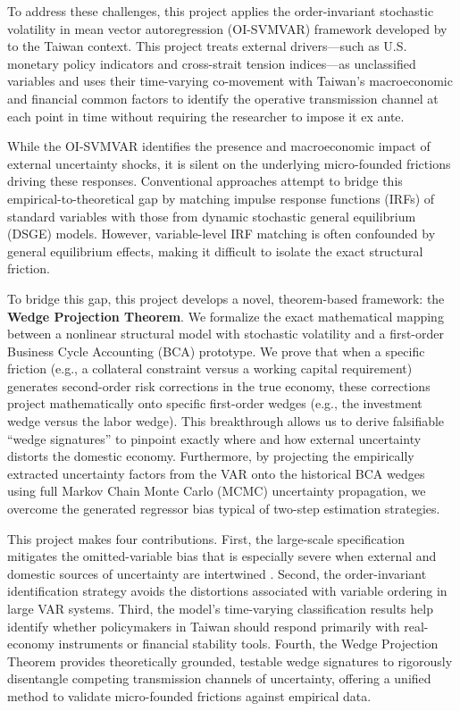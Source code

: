 To address these challenges, this project applies the order-invariant stochastic volatility in mean vector autoregression (OI-SVMVAR) framework developed by \citet{davidson2025investigating} to the Taiwan context. This project treats external drivers—such as U.S. monetary policy indicators and cross-strait tension indices—as unclassified variables and uses their time-varying co-movement with Taiwan’s macroeconomic and financial common factors to identify the operative transmission channel at each point in time without requiring the researcher to impose it ex ante. 

While the OI-SVMVAR identifies the presence and macroeconomic impact of external uncertainty shocks, it is silent on the underlying micro-founded frictions driving these responses. Conventional approaches attempt to bridge this empirical-to-theoretical gap by matching impulse response functions (IRFs) of standard variables with those from dynamic stochastic general equilibrium (DSGE) models. However, variable-level IRF matching is often confounded by general equilibrium effects, making it difficult to isolate the exact structural friction. 

To bridge this gap, this project develops a novel, theorem-based framework: the \textbf{Wedge Projection Theorem}. We formalize the exact mathematical mapping between a nonlinear structural model with stochastic volatility and a first-order Business Cycle Accounting (BCA) prototype. We prove that when a specific friction (e.g., a collateral constraint versus a working capital requirement) generates second-order risk corrections in the true economy, these corrections project mathematically onto specific first-order wedges (e.g., the investment wedge versus the labor wedge). This breakthrough allows us to derive falsifiable ``wedge signatures'' to pinpoint exactly where and how external uncertainty distorts the domestic economy. Furthermore, by projecting the empirically extracted uncertainty factors from the VAR onto the historical BCA wedges using full Markov Chain Monte Carlo (MCMC) uncertainty propagation, we overcome the generated regressor bias typical of two-step estimation strategies.

This project makes four contributions. First, the large-scale specification mitigates the omitted-variable bias that is especially severe when external and domestic sources of uncertainty are intertwined \citep{carriero2018measuring}. Second, the order-invariant identification strategy avoids the distortions associated with variable ordering in large VAR systems. Third, the model's time-varying classification results help identify whether policymakers in Taiwan should respond primarily with real-economy instruments or financial stability tools. Fourth, the Wedge Projection Theorem provides theoretically grounded, testable wedge signatures to rigorously disentangle competing transmission channels of uncertainty, offering a unified method to validate micro-founded frictions against empirical data.

